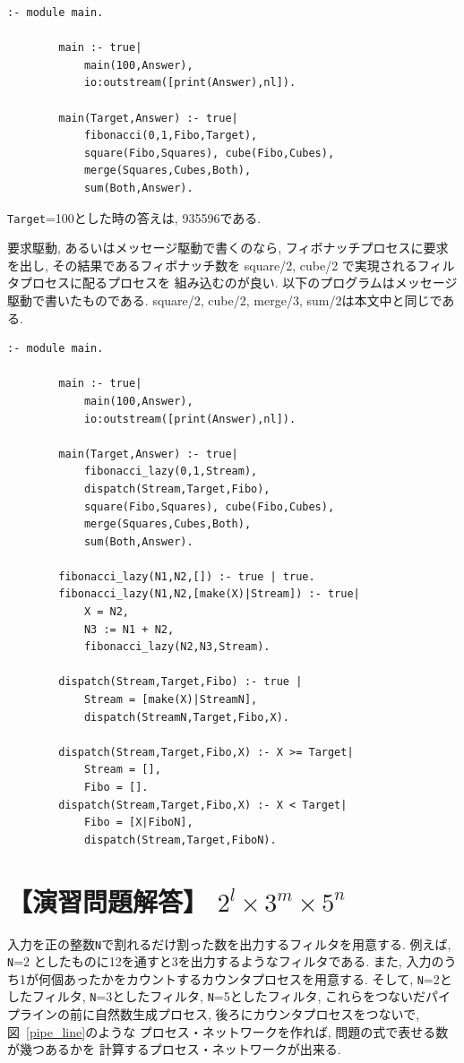 \documentclass[a4,titlepage]{jsreport}
\newcounter{exercise}
\newcommand{\answer}[1]{%
\section*{\refstepcounter{exercise}【演習問題解答\arabic{exercise}】 #1}}
\newenvironment{program}{\begin{quote}}{\end{quote}}
\begin{document}
\begin{Verbatim}[baselinestretch=0.8]
        :- module main.

        main :- true|
            main(100,Answer),
            io:outstream([print(Answer),nl]).

        main(Target,Answer) :- true|
            fibonacci(0,1,Fibo,Target),
            square(Fibo,Squares), cube(Fibo,Cubes),
            merge(Squares,Cubes,Both),
            sum(Both,Answer).
\end{Verbatim}

\verb!Target!=100とした時の答えは, 935596である.  

要求駆動, あるいはメッセージ駆動で書くのなら, 
フィボナッチプロセスに要求を出し, その結果であるフィボナッチ数を
square/2, cube/2 で実現されるフィルタプロセスに配るプロセスを
組み込むのが良い.  
以下のプログラムはメッセージ駆動で書いたものである.  
square/2, cube/2, merge/3, sum/2は本文中と同じである.  

\begin{Verbatim}[baselinestretch=0.8]
        :- module main.

        main :- true|
            main(100,Answer),
            io:outstream([print(Answer),nl]).

        main(Target,Answer) :- true|
            fibonacci_lazy(0,1,Stream),
            dispatch(Stream,Target,Fibo),
            square(Fibo,Squares), cube(Fibo,Cubes),
            merge(Squares,Cubes,Both),
            sum(Both,Answer).

        fibonacci_lazy(N1,N2,[]) :- true | true.
        fibonacci_lazy(N1,N2,[make(X)|Stream]) :- true|
            X = N2,
            N3 := N1 + N2,
            fibonacci_lazy(N2,N3,Stream).

        dispatch(Stream,Target,Fibo) :- true | 
            Stream = [make(X)|StreamN],
            dispatch(StreamN,Target,Fibo,X).

        dispatch(Stream,Target,Fibo,X) :- X >= Target|
            Stream = [],
            Fibo = [].
        dispatch(Stream,Target,Fibo,X) :- X < Target|
            Fibo = [X|FiboN],
            dispatch(Stream,Target,FiboN).
\end{Verbatim}

\answer{$2^{l} \times 3^{m} \times 5^{n}$}
入力を正の整数\verb!N!で割れるだけ割った数を出力するフィルタを用意する.  
例えば, \verb!N!=2 としたものに12を通すと3を出力するようなフィルタである.  
また, 入力のうち1が何個あったかをカウントするカウンタプロセスを用意する. 
そして, 
\verb!N!=2としたフィルタ, \verb!N!=3としたフィルタ, \verb!N!=5としたフィルタ, 
これらをつないだパイプラインの前に自然数生成プロセス, 
後ろにカウンタプロセスをつないで, 図~\ref{pipe_line}のような
プロセス・ネットワークを作れば, 問題の式で表せる数が幾つあるかを
計算するプロセス・ネットワークが出来る.  
\end{document}
